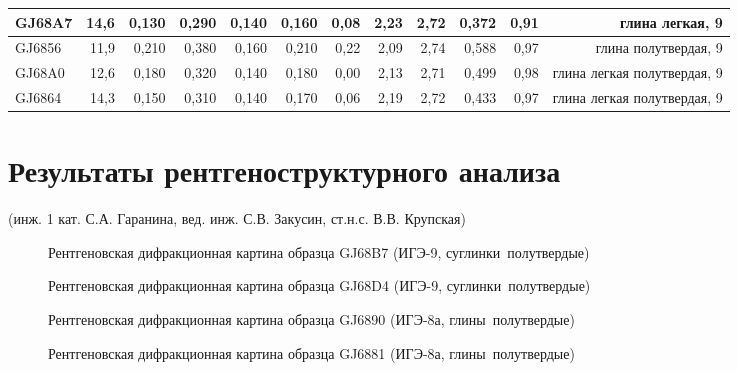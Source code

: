 \begin{landscape}
\begin{table}[h]
\begin{tabular}{@{}|l|r|r|r|r|r|r|r|r|r|r|r|@{}}
      GJ68A7          & 14,6       & 0,130                        & 0,290   & 0,140  & 0,160  & 0,08     & 2,23     & 2,72      & 0,372   & 0,91     & глина легкая, 9   \\ \hline
      GJ6856          & 11,9       & 0,210                        & 0,380   & 0,160  & 0,210  & 0,22     & 2,09     & 2,74      & 0,588   & 0,97     & глина полутвердая, 9   \\ \hline
      GJ68A0          & 12,6       & 0,180                        & 0,320   & 0,140  & 0,180  & 0,00     & 2,13     & 2,71      & 0,499   & 0,98     & глина легкая    полутвердая, 9   \\ \hline
      GJ6864          & 14,3       & 0,150                        & 0,310   & 0,140  & 0,170  & 0,06     & 2,19     & 2,72      & 0,433   & 0,97     & глина легкая    полутвердая, 9   \\ \hline
      \bottomrule 
      \end{tabular}
      \end{table}
    \end{landscape}

\chapter{Результаты рентгеноструктурного анализа}\label{app:difrac}
(инж. 1 кат. С.А. Гаранина, вед. инж. С.В. Закусин, ст.н.с. В.В. Крупская)

\begin{figure}[ht]
    \caption{Рентгеновская дифракционная картина образца GJ68B7 (ИГЭ-9, суглинки полутвердые)}\label{fig:fig}
  \end{figure}

  \begin{figure}[ht]
    \caption{Рентгеновская дифракционная картина образца GJ68D4 (ИГЭ-9, суглинки полутвердые)}\label{fig:fig}
  \end{figure}

  \begin{figure}[ht]
    \caption{Рентгеновская дифракционная картина образца GJ6890 (ИГЭ-8а, глины полутвердые)}\label{fig:fig}
  \end{figure}

  \begin{figure}[ht]
    \caption{Рентгеновская дифракционная картина образца GJ6881 (ИГЭ-8а, глины полутвердые)}\label{fig:fig}
  \end{figure}

